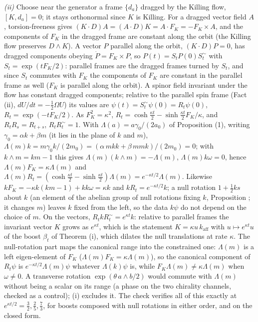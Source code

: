 \emph{(ii)} Choose near the generator a frame $\{d_{a}\}$ dragged by the Killing flow, $[K, d_{a}] = 0$; it stays orthonormal since $K$ is Killing. For a dragged vector field $A$, torsion-freeness gives $(K\cdot D)A = (A\cdot D)K = A\cdot F_{K} = -F_{K}\times A$, and the components of $F_{K}$ in the dragged frame are constant along the orbit (the Killing flow preserves $D\wedge K$). A vector $P$ parallel along the orbit, $(K\cdot D)P = 0$, has dragged components obeying $\dot P = F_{K}\times P$, so $P(t) = S_{t}P(0)S_{t}^{\sim}$ with $S_{t} = \exp(tF_{K}/2)$: parallel frames are the dragged frames turned by $S_{t}$, and since $S_{t}$ commutes with $F_{K}$ the components of $F_{K}$ are constant in the parallel frame as well ($F_{K}$ is parallel along the orbit). A spinor field invariant under the flow has constant dragged components; relative to the parallel spin frame (Fact (ii), $dU/dt = -\tfrac12\Omega U$) its values are $\psi(t) = S_{t}^{\sim}\psi(0) = R_{t}\psi(0)$, $R_{t} = \exp(-tF_{K}/2)$. As $F_{K}^{2} = \kappa^{2}$, $R_{t} = \cosh\tfrac{\kappa t}{2} - \sinh\tfrac{\kappa t}{2}F_{K}/\kappa$, and $R_{t}R_{s} = R_{t+s}$, $R_{t}R_{t}^{\sim} = 1$. With $\Lambda(a) = a\gamma_{0}/(2a_{0})$ of Proposition (1), writing $\gamma_{0} = \alpha k + \beta m$ (it lies in the plane of $k$ and $m$), $\Lambda(m)k = m\gamma_{0}k/(2m_{0}) = (\alpha\,mkk + \beta\,mmk)/(2m_{0}) = 0$; with $k\wedge m = km - 1$ this gives $\Lambda(m)(k\wedge m) = -\Lambda(m)$, $\Lambda(m)k\omega = 0$, hence $\Lambda(m)F_{K} = \kappa\Lambda(m)$ and $\Lambda(m)R_{t} = (\cosh\tfrac{\kappa t}{2} - \sinh\tfrac{\kappa t}{2})\Lambda(m) = e^{-\kappa t/2}\Lambda(m)$. Likewise $kF_{K} = -\kappa k(km - 1) + kk\omega = \kappa k$ and $kR_{t} = e^{-\kappa t/2}k$; a null rotation $1 + \tfrac12 ks$ about $k$ (an element of the abelian group of null rotations fixing $k$, Proposition ; it changes $m$) leaves $k$ fixed from the left, so the data $k\psi$ do not depend on the choice of $m$. On the vectors, $R_{t}kR_{t}^{\sim} = e^{\kappa t}k$: relative to parallel frames the invariant vector $K$ grows as $e^{\kappa t}$, which is the statement $K = \kappa u\,k_{\mathrm{aff}}$ with $u \mapsto e^{\kappa t}u$ of the boost $\beta_{t}$ of Theorem (i), which dilates the null translations at rate $\kappa$. The null-rotation part maps the canonical range into the constrained one: $\Lambda(m)$ is a left eigen-element of $F_{K}$ ($\Lambda(m)F_{K} = \kappa\Lambda(m)$), so the canonical component of $R_{t}\psi$ is $e^{-\kappa t/2}\Lambda(m)\psi$ whatever $\Lambda(k)\psi$ is, while $F_{K}\Lambda(m) \ne \kappa\Lambda(m)$ when $\omega \ne 0$. A transverse rotation $\exp(\theta\,a\wedge b/2)$ would commute with $\Lambda(m)$ without being a scalar on its range (a phase on the two chirality channels, checked as a control); (i) excludes it. The check verifies all of this exactly at $e^{\kappa t/2} = \tfrac32, \tfrac25, \tfrac73$, for boosts composed with null rotations in either order, and on the closed form.

